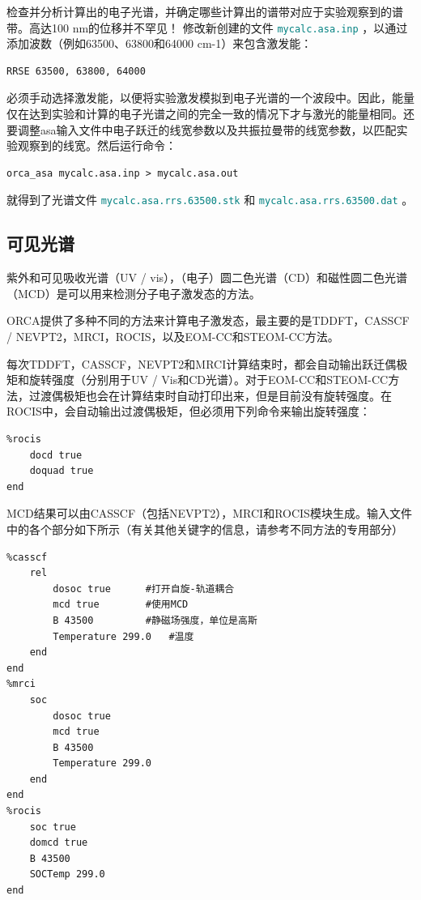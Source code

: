 \documentclass{ctexart}
\newcommand{\file}[1]{\textcolor{teal}{ \texttt{#1} }}
\begin{document}
	检查并分析计算出的电子光谱，并确定哪些计算出的谱带对应于实验观察到的谱带。高达100 nm的位移并不罕见！
	修改新创建的文件\file{mycalc.asa.inp}，以通过添加波数（例如63500、63800和64000 cm-1）来包含激发能：
	
	\begin{lstlisting}
RRSE 63500, 63800, 64000
	\end{lstlisting}
	
	必须手动选择激发能，以便将实验激发模拟到电子光谱的一个波段中。因此，能量仅在达到实验和计算的电子光谱之间的完全一致的情况下才与激光的能量相同。还要调整asa输入文件中电子跃迁的线宽参数以及共振拉曼带的线宽参数，以匹配实验观察到的线宽。然后运行命令：
	
	\begin{lstlisting}
orca_asa mycalc.asa.inp > mycalc.asa.out
	\end{lstlisting}
	
	就得到了光谱文件\file{mycalc.asa.rrs.63500.stk}和\file{mycalc.asa.rrs.63500.dat}。
	
	\subsection{可见光谱} 
	
	紫外和可见吸收光谱（UV / vis），（电子）圆二色光谱（CD）和磁性圆二色光谱（MCD）是可以用来检测分子电子激发态的方法。
	
	ORCA提供了多种不同的方法来计算电子激发态，最主要的是TDDFT，CASSCF / NEVPT2，MRCI，ROCIS，以及EOM-CC和STEOM-CC方法。
	
	每次TDDFT，CASSCF，NEVPT2和MRCI计算结束时，都会自动输出跃迁偶极矩和旋转强度（分别用于UV / Vis和CD光谱）。对于EOM-CC和STEOM-CC方法，过渡偶极矩也会在计算结束时自动打印出来，但是目前没有旋转强度。在ROCIS中，会自动输出过渡偶极矩，但必须用下列命令来输出旋转强度：
	
	\begin{lstlisting}
%rocis
	docd true 
	doquad true
end
	\end{lstlisting}
	
	MCD结果可以由CASSCF（包括NEVPT2），MRCI和ROCIS模块生成。输入文件中的各个部分如下所示（有关其他关键字的信息，请参考不同方法的专用部分）
	
	\begin{lstlisting}
%casscf 
	rel
		dosoc true		#打开自旋-轨道耦合
		mcd true		#使用MCD
		B 43500			#静磁场强度，单位是高斯
		Temperature 299.0	#温度
	end 
end
%mrci
	soc
		dosoc true 
		mcd true
		B 43500
		Temperature 299.0 
	end
end
%rocis 
	soc true
	domcd true 
	B 43500
	SOCTemp 299.0
end
	\end{lstlisting}
	
\end{document}
